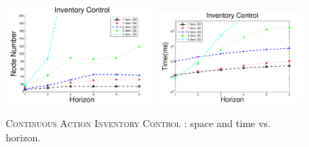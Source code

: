 \documentclass[twoside,11pt]{article}
\newcommand{\InventoryControl}{\textsc{Inventory Control }}
\begin{document}
\begin{figure}[tbp!]
\vspace{-2mm}
\centering
\includegraphics[width=0.49\textwidth]{Figures2/camdp/invCNode.pdf}
\includegraphics[width=0.49\textwidth]{Figures2/camdp/invCTime.pdf}
\vspace{-2mm}
\caption{%
\textsc{Continuous Action} \InventoryControl: space and time vs. horizon.
}
\label{fig:invC}
\vspace{-2mm}
\end{figure}
\end{document}
